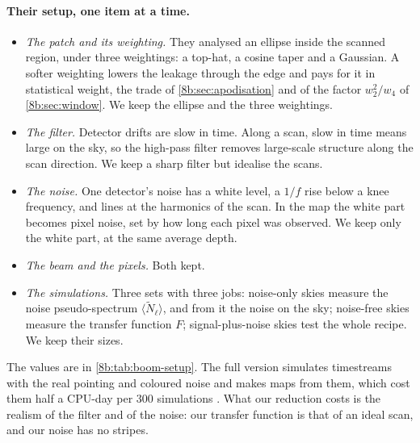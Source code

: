\paragraph{Their setup, one item at a time.}
\begin{itemize}
  \item \emph{The patch and its weighting.} They analysed an ellipse inside the scanned region, under
        three weightings: a top-hat, a cosine taper and a Gaussian. A softer weighting lowers the leakage
        through the edge and pays for it in statistical weight, the trade of \cref{8b:sec:apodisation}
        and of the factor $w_2^2/w_4$ of \cref{8b:sec:window}. We keep the ellipse and the three weightings.
  \item \emph{The filter.} Detector drifts are slow in time. Along a scan, slow in time means large on
        the sky, so the high-pass filter removes large-scale structure along the scan direction. We keep
        a sharp filter but idealise the scans.
  \item \emph{The noise.} One detector's noise has a white level, a $1/f$ rise below a knee frequency,
        and lines at the harmonics of the scan. In the map the white part becomes pixel noise, set by
        how long each pixel was observed. We keep only the white part, at the same average depth.
  \item \emph{The beam and the pixels.} Both kept.
  \item \emph{The simulations.} Three sets with three jobs: noise-only skies measure the noise
        pseudo-spectrum $\langle\widetilde N_\ell\rangle$, and from it the noise on the sky; noise-free skies measure the
        transfer function $F$; signal-plus-noise skies test the whole recipe. We keep their sizes.
\end{itemize}
The values are in \cref{8b:tab:boom-setup}. The full version simulates timestreams with the real
pointing and coloured noise and makes maps from them, which cost them half a CPU-day per $300$
simulations . What our reduction costs is the realism of the filter and of the
noise: our transfer function is that of an ideal scan, and our noise has no stripes.

